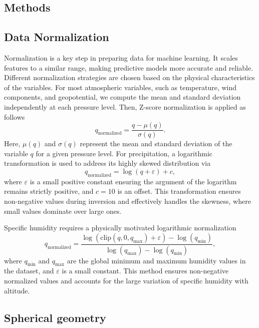 \documentclass[preprint]{article}
\begin{document}
\begin{appendices}

\section{Methods}

\subsection{Data Normalization}

Normalization is a key step in preparing data for machine learning. It scales features to a similar range, making predictive models more accurate and reliable. Different normalization strategies are chosen based on the physical characteristics of the variables. For most atmospheric variables, such as temperature, wind components, and geopotential, we compute the mean and standard deviation independently at each pressure level. Then, Z-score normalization is applied as follows
\begin{equation}
q_{\text{normalized}} = \frac{q - \mu(q)}{\sigma(q)}.
\end{equation}
Here, $\mu(q)$ and $\sigma(q)$ represent the mean and standard deviation of the variable $q$ for a given pressure level. For precipitation, a logarithmic transformation is used to address its highly skewed distribution via
\begin{equation}
q_{\text{normalized}} = \log(q + \varepsilon) + c,
\end{equation}
where $\varepsilon$ is a small positive constant ensuring the argument of the logarithm remains strictly positive, and $c = 10$ is an offset. This transformation ensures non-negative values during inversion and effectively handles the skewness, where small values dominate over large ones.

Specific humidity requires a physically motivated logarithmic normalization 
\begin{equation}
q_{\text{normalized}} = \frac{\log(\text{clip}(q, 0, q_{\text{max}}) + \varepsilon) - \log(q_{\text{min}})}{\log(q_{\text{max}}) - \log(q_{\text{min}})},
\end{equation}
where $q_{\text{min}}$ and $q_{\text{max}}$ are the global minimum and maximum humidity values in the dataset, and $\varepsilon$ is a small constant. This method ensures non-negative normalized values and accounts for the large variation of specific humidity with altitude.

\subsection{Spherical geometry}\label{appendix:padding}


\end{appendices}
\end{document}
